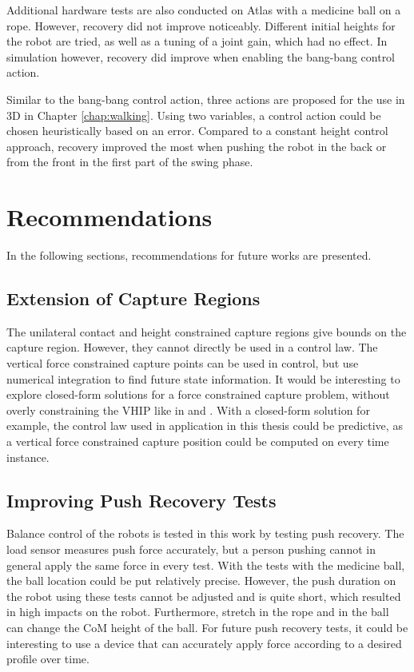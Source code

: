 Additional hardware tests are also conducted on Atlas with a medicine ball on a rope. However, recovery did not improve noticeably. Different initial heights for the robot are tried, as well as a tuning of a joint gain, which had no effect. In simulation however, recovery did improve when enabling the bang-bang control action.

Similar to the bang-bang control action, three actions are proposed for the use in \ac{3D} in Chapter \ref{chap:walking}. Using two variables, a control action could be chosen heuristically based on an error. Compared to a constant height control approach, recovery improved the most when pushing the robot in the back or from the front in the first part of the swing phase. 

\section{Recommendations}
In the following sections, recommendations for future works are presented.
\subsection{Extension of Capture Regions}
The unilateral contact and height constrained capture regions give bounds on the capture region. However, they cannot directly be used in a control law. The vertical force constrained capture points can be used in control, but use numerical integration to find future state information. It would be interesting to explore closed-form solutions for a force constrained capture problem, without overly constraining the \ac{VHIP} like in \cite{pratt2007derivation} and \cite{koolen2016balance}. With a closed-form solution for example, the control law used in application in this thesis could be predictive, as a vertical force constrained capture position could be computed on every time instance.
\subsection{Improving Push Recovery Tests}
Balance control of the robots is tested in this work by testing push recovery. The load sensor measures push force accurately, but a person pushing cannot in general apply the same force in every test. With the tests with the medicine ball, the ball location could be put relatively precise. However, the push duration on the robot using these tests cannot be adjusted and is quite short, which resulted in high impacts on the robot. Furthermore, stretch in the rope and in the ball can change the \ac{CoM} height of the ball. For future push recovery tests, it could be interesting to use a device that can accurately apply force according to a desired profile over time.
